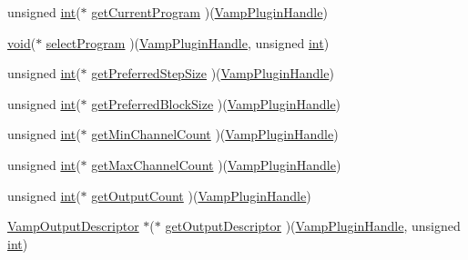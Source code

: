 \begin{DoxyCompactItemize}
\item 
unsigned \hyperlink{xmltok_8h_a5a0d4a5641ce434f1d23533f2b2e6653}{int}($\ast$ \hyperlink{struct___vamp_plugin_descriptor_a2d13712798238db503005808b736cb18}{get\+Current\+Program} )(\hyperlink{vamp_8h_ad3be2952b1f4ad7d775940a6db75c79b}{Vamp\+Plugin\+Handle})
\item 
\hyperlink{sound_8c_ae35f5844602719cf66324f4de2a658b3}{void}($\ast$ \hyperlink{struct___vamp_plugin_descriptor_a688596d8abcdd638250799314ef9cb19}{select\+Program} )(\hyperlink{vamp_8h_ad3be2952b1f4ad7d775940a6db75c79b}{Vamp\+Plugin\+Handle}, unsigned \hyperlink{xmltok_8h_a5a0d4a5641ce434f1d23533f2b2e6653}{int})
\item 
unsigned \hyperlink{xmltok_8h_a5a0d4a5641ce434f1d23533f2b2e6653}{int}($\ast$ \hyperlink{struct___vamp_plugin_descriptor_ae8efb5dec4a16b74fbb32ef36fc90e09}{get\+Preferred\+Step\+Size} )(\hyperlink{vamp_8h_ad3be2952b1f4ad7d775940a6db75c79b}{Vamp\+Plugin\+Handle})
\item 
unsigned \hyperlink{xmltok_8h_a5a0d4a5641ce434f1d23533f2b2e6653}{int}($\ast$ \hyperlink{struct___vamp_plugin_descriptor_a3052e7f14ad1dfc3000b3b91dddf8c61}{get\+Preferred\+Block\+Size} )(\hyperlink{vamp_8h_ad3be2952b1f4ad7d775940a6db75c79b}{Vamp\+Plugin\+Handle})
\item 
unsigned \hyperlink{xmltok_8h_a5a0d4a5641ce434f1d23533f2b2e6653}{int}($\ast$ \hyperlink{struct___vamp_plugin_descriptor_a8a9be1cf9e70d46d20cac1b0049149cd}{get\+Min\+Channel\+Count} )(\hyperlink{vamp_8h_ad3be2952b1f4ad7d775940a6db75c79b}{Vamp\+Plugin\+Handle})
\item 
unsigned \hyperlink{xmltok_8h_a5a0d4a5641ce434f1d23533f2b2e6653}{int}($\ast$ \hyperlink{struct___vamp_plugin_descriptor_af34bce679c821c38dbd212a0ef1bf867}{get\+Max\+Channel\+Count} )(\hyperlink{vamp_8h_ad3be2952b1f4ad7d775940a6db75c79b}{Vamp\+Plugin\+Handle})
\item 
unsigned \hyperlink{xmltok_8h_a5a0d4a5641ce434f1d23533f2b2e6653}{int}($\ast$ \hyperlink{struct___vamp_plugin_descriptor_a71825defc0052a8ac307e2c333c4b935}{get\+Output\+Count} )(\hyperlink{vamp_8h_ad3be2952b1f4ad7d775940a6db75c79b}{Vamp\+Plugin\+Handle})
\item 
\hyperlink{vamp_8h_aa8429dd9c60d65800c58574c2b06bf66}{Vamp\+Output\+Descriptor} $\ast$($\ast$ \hyperlink{struct___vamp_plugin_descriptor_a033116c818aafe70e7fd15d240234754}{get\+Output\+Descriptor} )(\hyperlink{vamp_8h_ad3be2952b1f4ad7d775940a6db75c79b}{Vamp\+Plugin\+Handle}, unsigned \hyperlink{xmltok_8h_a5a0d4a5641ce434f1d23533f2b2e6653}{int})
\item 

\end{DoxyCompactItemize}
